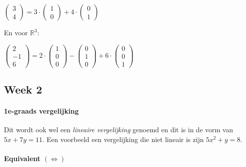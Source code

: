\documentclass[11pt]{article}
\begin{document}
\(\begin{pmatrix} 3 \\ 4\end{pmatrix} = 3\cdot \begin{pmatrix} 1 \\ 0 \end{pmatrix} + 4 \cdot \begin{pmatrix} 0 \\ 1\end{pmatrix}\)

En voor \(\mathbb{R}^3\):

\(\begin{pmatrix} 2 \\ -1 \\ 6 \end{pmatrix} = 2 \cdot \begin{pmatrix} 1 \\ 0 \\ 0 \end{pmatrix} - \begin{pmatrix} 0 \\ 1 \\ 0\end{pmatrix} + 6 \cdot \begin{pmatrix} 0 \\ 0 \\ 1\end{pmatrix}\)

    \hypertarget{week-2}{%
\subsection{Week 2}\label{week-2}}

    \hypertarget{e-graads-vergelijking}{%
\paragraph{1e-graads vergelijking}\label{e-graads-vergelijking}}

    Dit wordt ook wel een \emph{lineaire vergelijking} genoemd en dit is in
de vorm van \(5x+7y=11\). Een voorbeeld een vergelijking die niet
lineair is zijn \(5x^2 + y = 8\).

    \hypertarget{equivalent-iff}{%
\paragraph{\texorpdfstring{Equivalent
\((\iff)\)}{Equivalent (\textbackslash{}iff)}}\label{equivalent-iff}}
\end{document}
